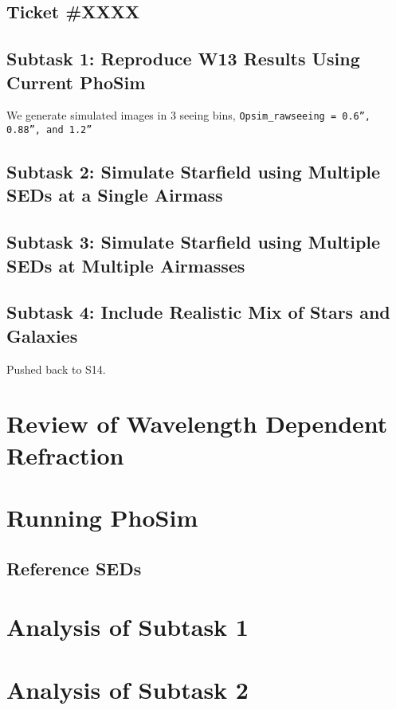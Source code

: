 \documentclass[prd, nofootinbib, floatfix, 11pt, tightenlines, times]{article}
\begin{document}
\subsection{Ticket #XXXX}

\subsection{Subtask 1: Reproduce W13 Results Using Current PhoSim}


We generate simulated images in 3 seeing bins, {\tt Opsim\_rawseeing =
  0.6'', 0.88'', and 1.2''}


\subsection{Subtask 2: Simulate Starfield using Multiple SEDs at a Single Airmass}
\subsection{Subtask 3: Simulate Starfield using Multiple SEDs at Multiple Airmasses}
\subsection{Subtask 4: Include Realistic Mix of Stars and Galaxies}
Pushed back to S14.

\section{Review of Wavelength Dependent Refraction \label{sec:theory}}

\section{Running PhoSim}

\subsection{Reference SEDs \label{sec:seds}}

\section{Analysis of Subtask 1}

\section{Analysis of Subtask 2}
\end{document}
